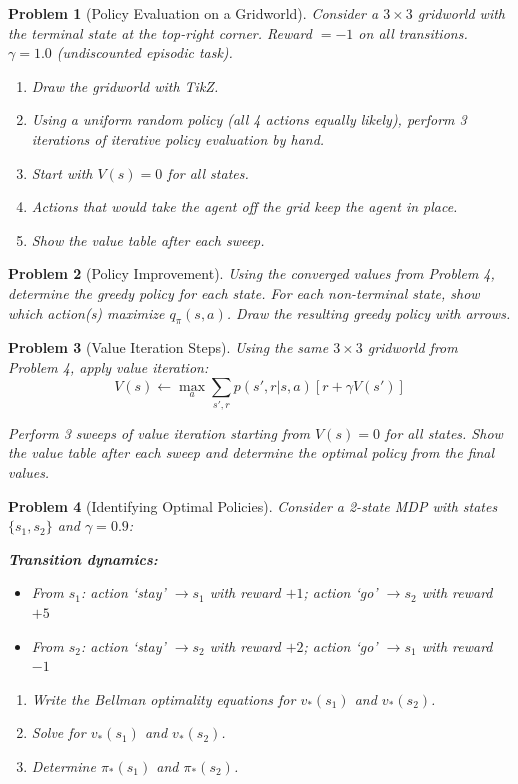 \documentclass[11pt]{article}
\newtheorem{problem}{Problem}
\theoremstyle{definition}
\begin{document}
\begin{problem}[Policy Evaluation on a Gridworld]
Consider a $3 \times 3$ gridworld with the terminal state at the top-right corner. Reward $= -1$ on all transitions. $\gamma = 1.0$ (undiscounted episodic task).

\begin{enumerate}[label=(\alph*)]
    \item Draw the gridworld with TikZ.
    \item Using a uniform random policy (all 4 actions equally likely), perform 3 iterations of iterative policy evaluation by hand.
    \item Start with $V(s) = 0$ for all states.
    \item Actions that would take the agent off the grid keep the agent in place.
    \item Show the value table after each sweep.
\end{enumerate}
\end{problem}

\vfill
\newpage

\begin{problem}[Policy Improvement]
Using the converged values from Problem 4, determine the greedy policy for each state. For each non-terminal state, show which action(s) maximize $q_\pi(s,a)$. Draw the resulting greedy policy with arrows.
\end{problem}

\vfill
\newpage

\begin{problem}[Value Iteration Steps]
Using the same $3 \times 3$ gridworld from Problem 4, apply value iteration:
\[
V(s) \leftarrow \max_a \sum_{s',r} p(s',r|s,a)[r + \gamma V(s')]
\]

Perform 3 sweeps of value iteration starting from $V(s) = 0$ for all states. Show the value table after each sweep and determine the optimal policy from the final values.
\end{problem}

\vfill
\newpage

\begin{problem}[Identifying Optimal Policies]
Consider a 2-state MDP with states $\{s_1, s_2\}$ and $\gamma = 0.9$:

\textbf{Transition dynamics:}
\begin{itemize}
    \item From $s_1$: action `stay' $\to s_1$ with reward $+1$; action `go' $\to s_2$ with reward $+5$
    \item From $s_2$: action `stay' $\to s_2$ with reward $+2$; action `go' $\to s_1$ with reward $-1$
\end{itemize}

\begin{enumerate}[label=(\alph*)]
    \item Write the Bellman optimality equations for $v_*(s_1)$ and $v_*(s_2)$.
    \item Solve for $v_*(s_1)$ and $v_*(s_2)$.
    \item Determine $\pi_*(s_1)$ and $\pi_*(s_2)$.
\end{enumerate}
\end{problem}
\end{document}
